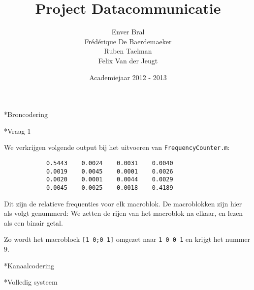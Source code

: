 \documentclass[]{article}
\begin{document}
\title{Project Datacommunicatie}
\author{Enver Bral \\ Fr\'ed\'erique De Baerdemaeker \\ Ruben Taelman \\ Felix Van der Jeugt}
\date{Academiejaar 2012 - 2013}
\maketitle

\begin{section}*{Broncodering}

    \begin{subsection}*{Vraag 1}

        We verkrijgen volgende output bij het uitvoeren van
        \texttt{FrequencyCounter.m}:

        \begin{lstlisting}
            0.5443    0.0024    0.0031    0.0040
            0.0019    0.0045    0.0001    0.0026
            0.0020    0.0001    0.0044    0.0029
            0.0045    0.0025    0.0018    0.4189
        \end{lstlisting}

        Dit zijn de relatieve frequenties voor elk macroblok. De
        macroblokken zijn hier als volgt genummerd: We zetten de rijen
        van het macroblok na elkaar, en lezen als een binair getal.

        Zo wordt het macroblock \texttt{[1 0;0 1]} omgezet naar
        \texttt{1 0 0 1} en krijgt het nummer $9$.

    \end{subsection}
\end{section}
\begin{section}*{Kanaalcodering}
\end{section}
\begin{section}*{Volledig systeem}
\end{section}
\end{document}
